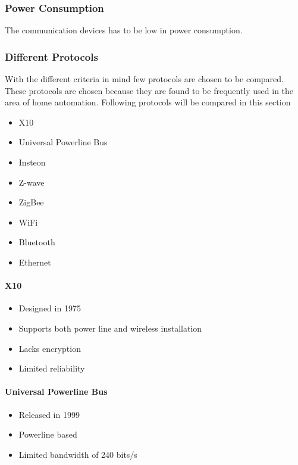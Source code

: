 \subsubsection{Power Consumption}
The communication devices has to be low in power consumption.

\subsubsection{Different Protocols}
With the different criteria in mind few protocols are chosen to be compared. These protocols are chosen because they are found to be frequently used in the area of home automation.
Following protocols will be compared in this section

\begin{itemize}
\item X10
\item Universal Powerline Bus
\item Insteon
\item Z-wave
\item ZigBee
\item WiFi
\item Bluetooth
\item Ethernet
\end{itemize}


\paragraph{X10} \cite{wiki_x10}

\begin{itemize}
\item Designed in 1975
\item Supports both power line and wireless installation
\item Lacks encryption
\item Limited reliability
\end{itemize}


\paragraph{Universal Powerline Bus} \cite{wiki_upb}

\begin{itemize}
\item Released in 1999
\item Powerline based
\item Limited bandwidth of 240 bits/s
\end{itemize}


